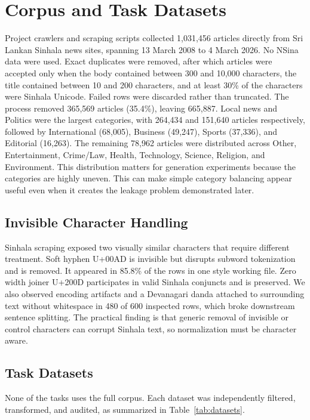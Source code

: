 \documentclass[a4paper,conference]{IEEEtran}
\begin{document}
\section{Corpus and Task Datasets}
Project crawlers and scraping scripts collected 1,031,456 articles directly
from Sri Lankan Sinhala news sites, spanning 13 March 2008 to 4 March 2026. No
NSina data were used. Exact duplicates were removed, after which articles were
accepted only when the body contained between 300 and 10,000 characters, the title
contained between 10 and 200 characters, and at least 30\% of the characters were Sinhala Unicode. Failed rows
were discarded rather than truncated. The process removed 365,569 articles
(35.4\%), leaving 665,887. Local news and Politics were the largest categories,
with 264,434 and 151,640 articles respectively, followed by International
(68,005), Business (49,247), Sports (37,336), and Editorial (16,263). The
remaining 78,962 articles were distributed across Other, Entertainment,
Crime/Law, Health, Technology, Science, Religion, and Environment. This
distribution matters for generation experiments because the categories are
highly uneven. This can make simple category balancing
appear useful even when it creates the leakage problem demonstrated later.

\subsection{Invisible Character Handling}
Sinhala scraping exposed two visually similar characters that require different
treatment. Soft hyphen U+00AD is invisible but disrupts subword tokenization and
is removed. It appeared in 85.8\% of the rows in one style working file.
Zero width joiner U+200D participates in valid Sinhala conjuncts and is
preserved. We also observed encoding artifacts and a Devanagari danda attached
to surrounding text without whitespace in 480 of 600 inspected rows, which
broke downstream sentence splitting. The practical finding is that generic
removal of invisible or control characters can corrupt Sinhala text, so
normalization must be character aware.

\subsection{Task Datasets}
None of the tasks uses the full corpus. Each dataset was independently filtered,
transformed, and audited, as summarized in Table~\ref{tab:datasets}.
\end{document}
